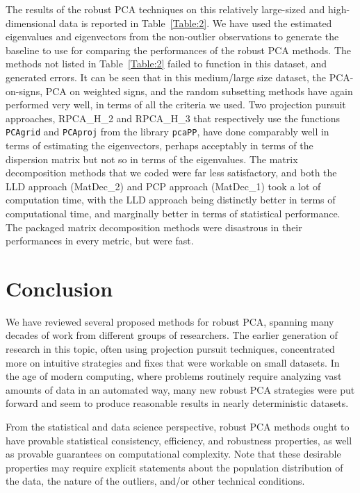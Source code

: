 \documentclass[ss]{imsart}
\theoremstyle{Example}
\begin{document}
 The results of the robust PCA techniques on this relatively large-sized and high-dimensional data is reported in Table~\ref{Table:2}. We have used the estimated eigenvalues and eigenvectors from the non-outlier observations to generate the baseline to use for comparing the performances of the robust PCA methods. The methods not listed in Table~\ref{Table:2} failed to function in this dataset, and generated errors. It can be seen that in this medium/large size dataset, the  PCA-on-signs, PCA on weighted signs, and the random subsetting methods have again performed very well, in terms of all the criteria we used. Two projection pursuit approaches, RPCA\_H\_2 and RPCA\_H\_3 that respectively use the functions \texttt{PCAgrid} and \texttt{PCAproj} from the library \texttt{pcaPP}, have done comparably well in terms of estimating the eigenvectors, perhaps acceptably in terms of the dispersion matrix but not so in terms of the eigenvalues. The matrix decomposition methods that we coded were far less satisfactory, and both the LLD approach (MatDec\_2) and PCP  approach (MatDec\_1) took a lot of computation time, with the LLD approach being distinctly better in terms of computational time, and marginally better in terms of statistical performance. The packaged matrix decomposition methods were disastrous in their performances in every metric, but were fast.

\section{Conclusion}
\label{Sec:Conclusion}
We have reviewed several  proposed methods for robust PCA, spanning many decades of work from different groups of researchers. The earlier generation of research in this topic, often using projection pursuit techniques,  concentrated more on intuitive strategies and fixes that were workable on small datasets. In the age of modern computing, where problems routinely require analyzing vast amounts of data in an automated way, many new robust PCA strategies were put forward and seem to produce reasonable results in nearly deterministic datasets.

From the statistical and data science perspective, robust PCA methods ought to have provable statistical consistency, efficiency, and robustness properties, as well as provable guarantees on computational complexity. Note that these desirable properties may require explicit statements about the population distribution of the data,  the nature of the outliers, and/or other technical conditions. 
\end{document}
